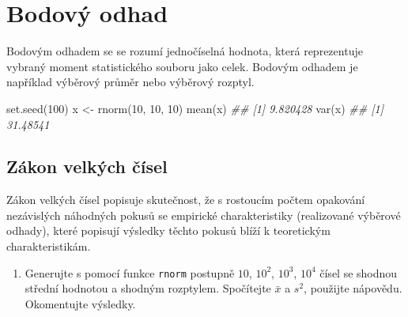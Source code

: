 \documentclass[
  letterpaper,
  DIV=11,
  numbers=noendperiod]{scrreprt}
\newenvironment{Shaded}{\begin{snugshade}}{\end{snugshade}}
\newcommand{\DecValTok}[1]{\textcolor[rgb]{0.68,0.00,0.00}{#1}}
\newcommand{\DocumentationTok}[1]{\textcolor[rgb]{0.37,0.37,0.37}{\textit{#1}}}
\newcommand{\FunctionTok}[1]{\textcolor[rgb]{0.28,0.35,0.67}{#1}}
\newcommand{\NormalTok}[1]{\textcolor[rgb]{0.00,0.23,0.31}{#1}}
\newcommand{\OtherTok}[1]{\textcolor[rgb]{0.00,0.23,0.31}{#1}}
\providecommand{\tightlist}{%
  \setlength{\itemsep}{0pt}\setlength{\parskip}{0pt}}\usepackage{longtable,booktabs,array}
\begin{document}
\hypertarget{bodovuxfd-odhad}{%
\section{Bodový odhad}\label{bodovuxfd-odhad}}

Bodovým odhadem se se rozumí jednočíselná hodnota, která reprezentuje
vybraný moment statistického souboru jako celek. Bodovým odhadem je
například výběrový průměr nebo výběrový rozptyl.

\begin{Shaded}
\begin{Highlighting}[]
\FunctionTok{set.seed}\NormalTok{(}\DecValTok{100}\NormalTok{)}
\NormalTok{x }\OtherTok{\textless{}{-}} \FunctionTok{rnorm}\NormalTok{(}\DecValTok{10}\NormalTok{, }\DecValTok{10}\NormalTok{, }\DecValTok{10}\NormalTok{)}
\FunctionTok{mean}\NormalTok{(x)}
\DocumentationTok{\#\# [1] 9.820428}
\FunctionTok{var}\NormalTok{(x)}
\DocumentationTok{\#\# [1] 31.48541}
\end{Highlighting}
\end{Shaded}

\hypertarget{zuxe1kon-velkuxfdch-ux10duxedsel}{%
\subsection{Zákon velkých
čísel}\label{zuxe1kon-velkuxfdch-ux10duxedsel}}

Zákon velkých čísel popisuje skutečnost, že s rostoucím počtem opakování
nezávislých náhodných pokusů se empirické charakteristiky (realizované
výběrové odhady), které popisují výsledky těchto pokusů blíží k
teoretickým charakteristikám.

\begin{tcolorbox}[enhanced jigsaw, toprule=.15mm, breakable, title=\textcolor{quarto-callout-tip-color}{\faLightbulb}\hspace{0.5em}{Cvičení}, colframe=quarto-callout-tip-color-frame, bottomrule=.15mm, left=2mm, leftrule=.75mm, colbacktitle=quarto-callout-tip-color!10!white, colback=white, bottomtitle=1mm, toptitle=1mm, opacityback=0, opacitybacktitle=0.6, arc=.35mm, coltitle=black, rightrule=.15mm, titlerule=0mm]

\begin{enumerate}
\def\labelenumi{\arabic{enumi}.}
\tightlist
\item
  Generujte s pomocí funkce \texttt{rnorm} postupně \(10\), \(10^2\),
  \(10^3\), \(10^4\) čísel se shodnou střední hodnotou a shodným
  rozptylem. Spočítejte \(\bar{x}\) a \({s^2}\), použijte nápovědu.
  Okomentujte výsledky.
\end{enumerate}

\end{tcolorbox}
\end{document}
